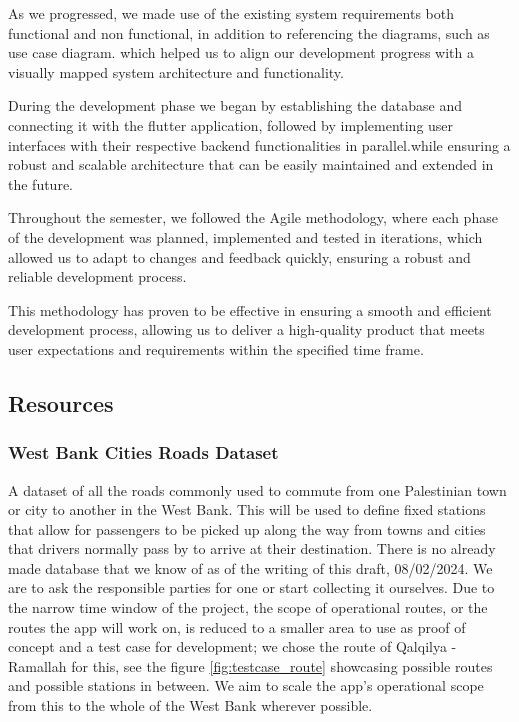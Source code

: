 \documentclass[a4paper, 12pt]{report} %
\begin{document}
            As we progressed, we made use of the existing system requirements both functional and non functional, in addition to referencing the diagrams, such as use case diagram. which helped us to align our development progress with a visually mapped system architecture and functionality.

            During the development phase we began by establishing the database and connecting it with the flutter application, followed by implementing user interfaces with their respective backend functionalities in parallel.while ensuring a robust and scalable architecture that can be easily maintained and extended in the future.

            Throughout the semester, we followed the Agile methodology, where each phase of the development was planned, implemented and tested in iterations, which allowed us to adapt to changes and feedback quickly, ensuring a robust and reliable development process.
            
            This methodology has proven to be effective in ensuring a smooth and efficient development process, allowing us to deliver a high-quality product that meets user expectations and requirements within the specified time frame.

        \subsection{Resources}
            \subsubsection{West Bank Cities Roads Dataset}
                A dataset of all the roads commonly used to commute from one Palestinian town or city to another in the West Bank. This will be used to define fixed stations that allow for passengers to be picked up along the way from towns and cities that drivers normally pass by to arrive at their destination. There is no already made database that we know of as of the writing of this draft, 08/02/2024. We are to ask the responsible parties for one or start collecting it ourselves. Due to the narrow time window of the project, the scope of operational routes, or the routes the app will work on, is reduced to a smaller area to use as proof of concept and a test case for development; we chose the route of Qalqilya - Ramallah for this, see the figure \ref{fig:testcase_route} showcasing possible routes and possible stations in between. We aim to scale the app's operational scope from this to the whole of the West Bank wherever possible.
                
\end{document}
